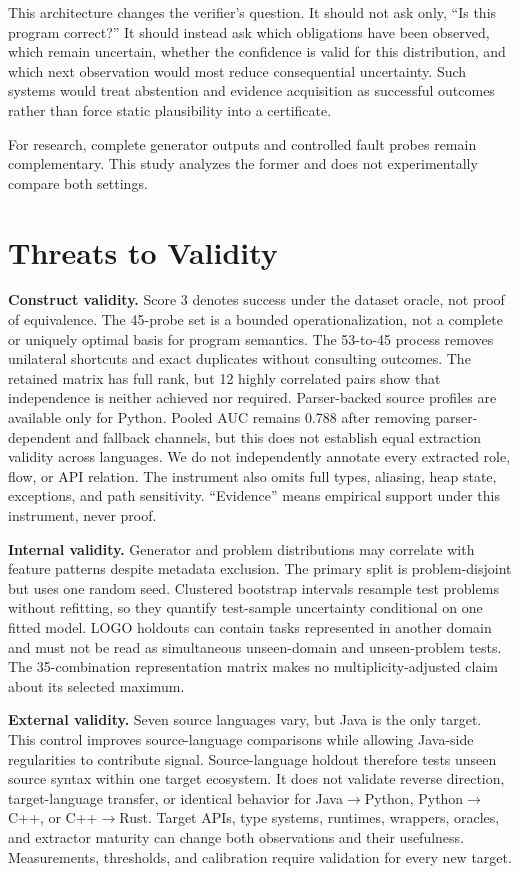 \documentclass[conference]{IEEEtran}
\begin{document}
This architecture changes the verifier's question. It should not ask only, ``Is this program correct?'' It should instead ask which obligations have been observed, which remain uncertain, whether the confidence is valid for this distribution, and which next observation would most reduce consequential uncertainty. Such systems would treat abstention and evidence acquisition as successful outcomes rather than force static plausibility into a certificate.

For research, complete generator outputs and controlled fault probes remain complementary. This study analyzes the former and does not experimentally compare both settings.

\section{Threats to Validity}
\textbf{Construct validity.} Score 3 denotes success under the dataset oracle, not proof of equivalence. The 45-probe set is a bounded operationalization, not a complete or uniquely optimal basis for program semantics. The 53-to-45 process removes unilateral shortcuts and exact duplicates without consulting outcomes. The retained matrix has full rank, but 12 highly correlated pairs show that independence is neither achieved nor required. Parser-backed source profiles are available only for Python. Pooled AUC remains 0.788 after removing parser-dependent and fallback channels, but this does not establish equal extraction validity across languages. We do not independently annotate every extracted role, flow, or API relation. The instrument also omits full types, aliasing, heap state, exceptions, and path sensitivity. ``Evidence'' means empirical support under this instrument, never proof.

\textbf{Internal validity.} Generator and problem distributions may correlate with feature patterns despite metadata exclusion. The primary split is problem-disjoint but uses one random seed. Clustered bootstrap intervals resample test problems without refitting, so they quantify test-sample uncertainty conditional on one fitted model. LOGO holdouts can contain tasks represented in another domain and must not be read as simultaneous unseen-domain and unseen-problem tests. The 35-combination representation matrix makes no multiplicity-adjusted claim about its selected maximum.

\textbf{External validity.} Seven source languages vary, but Java is the only target. This control improves source-language comparisons while allowing Java-side regularities to contribute signal. Source-language holdout therefore tests unseen source syntax within one target ecosystem. It does not validate reverse direction, target-language transfer, or identical behavior for Java$\rightarrow$Python, Python$\rightarrow$C++, or C++$\rightarrow$Rust. Target APIs, type systems, runtimes, wrappers, oracles, and extractor maturity can change both observations and their usefulness. Measurements, thresholds, and calibration require validation for every new target.
\end{document}
